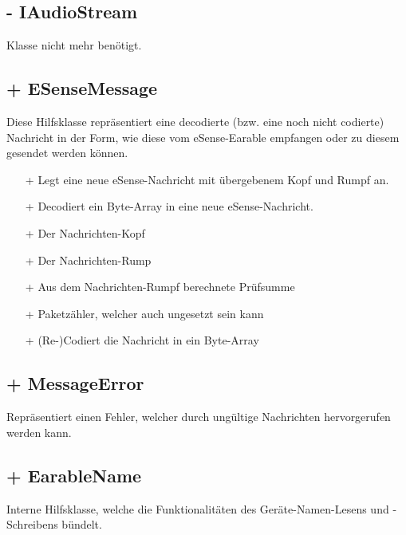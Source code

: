 \documentclass[../implementierung.tex]{subfiles}
\begin{document}
		\subsection{- IAudioStream}
			Klasse nicht mehr benötigt.

		\subsection{+ ESenseMessage}
			Diese Hilfsklasse repräsentiert eine decodierte (bzw. eine noch nicht codierte) Nachricht in der Form,
			wie diese vom eSense-Earable empfangen oder zu diesem gesendet werden können.
			\begin{itemize}
				\item[+]{ Legt eine neue eSense-Nachricht mit übergebenem Kopf und Rumpf an.}
				\item[+]{ Decodiert ein Byte-Array in eine neue eSense-Nachricht.}
				\item[+]{ Der Nachrichten-Kopf}
				\item[+]{ Der Nachrichten-Rump}
				\item[+]{ Aus dem Nachrichten-Rumpf berechnete Prüfsumme}
				\item[+]{ Paketzähler, welcher auch ungesetzt sein kann}
				\item[+]{ (Re-)Codiert die Nachricht in ein Byte-Array}
			\end{itemize}

		\subsection{+ MessageError}
			Repräsentiert einen Fehler, welcher durch ungültige Nachrichten hervorgerufen werden kann.

		\subsection{+ EarableName}
			Interne Hilfsklasse, welche die Funktionalitäten des Geräte-Namen-Lesens und -Schreibens bündelt.
\end{document}
